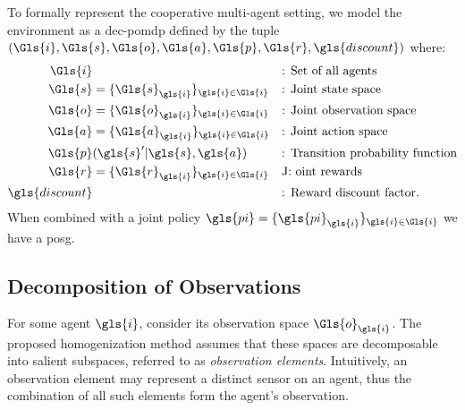 To formally represent the cooperative multi-agent setting,
we model the environment as a \gls{dec-pomdp}
defined by the tuple \((\Gls{i},\Gls{s},\Gls{o},\Gls{a},\Gls{p},\Gls{r},\gls{discount})\) where:
%
\begin{align*}
    \Gls{i}& && \text{: Set of all agents} \\
    \Gls{s}& = \{\Gls{s}_{\gls{i}}\}_{\gls{i}\in \Gls{i}} && \text{: Joint state space} \\
    \Gls{o}& = \{\Gls{o}_{\gls{i}}\}_{\gls{i}\in \Gls{i}} && \text{: Joint observation space} \\
    \Gls{a}& = \{\Gls{a}_{\gls{i}}\}_{\gls{i}\in \Gls{i}} && \text{: Joint action space} \\
    \Gls{p}&(\gls{s}^\prime|\gls{s},\gls{a}) && \text{: Transition probability function} \\
    \Gls{r}& = \{\Gls{r}_{\gls{i}}\}_{\gls{i}\in \Gls{i}} && \text{J: oint rewards} \\
    \gls{discount}& && \text{: Reward discount factor.}
\end{align*}
%
When combined with a joint policy \(\gls{pi} = \{\gls{pi}_{\gls{i}}\}_{\gls{i}\in \Gls{i}}\) 
we have a \gls{posg}.

\subsection{Decomposition of Observations}

For some agent \(\gls{i}\), consider its observation space \(\Gls{o}_{\gls{i}}\).
The proposed homogenization method assumes that these spaces are 
decomposable into salient subspaces, referred to as \emph{observation elements}.
Intuitively, an observation element may represent a distinct sensor on an agent,
thus the combination of all such elements form the agent's observation.

